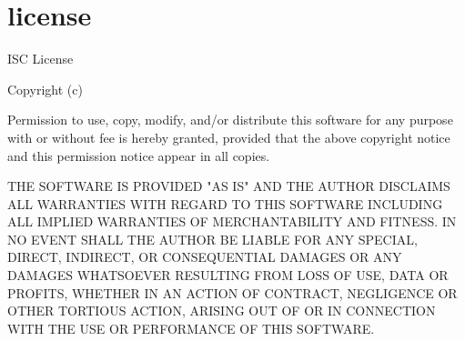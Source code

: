\chapter{license}
\hypertarget{md_node__modules_2css-declaration-sorter_2license}{}\label{md_node__modules_2css-declaration-sorter_2license}
ISC License

Copyright (c)

Permission to use, copy, modify, and/or distribute this software for any purpose with or without fee is hereby granted, provided that the above copyright notice and this permission notice appear in all copies.

THE SOFTWARE IS PROVIDED "{}\+AS IS"{} AND THE AUTHOR DISCLAIMS ALL WARRANTIES WITH REGARD TO THIS SOFTWARE INCLUDING ALL IMPLIED WARRANTIES OF MERCHANTABILITY AND FITNESS. IN NO EVENT SHALL THE AUTHOR BE LIABLE FOR ANY SPECIAL, DIRECT, INDIRECT, OR CONSEQUENTIAL DAMAGES OR ANY DAMAGES WHATSOEVER RESULTING FROM LOSS OF USE, DATA OR PROFITS, WHETHER IN AN ACTION OF CONTRACT, NEGLIGENCE OR OTHER TORTIOUS ACTION, ARISING OUT OF OR IN CONNECTION WITH THE USE OR PERFORMANCE OF THIS SOFTWARE. 